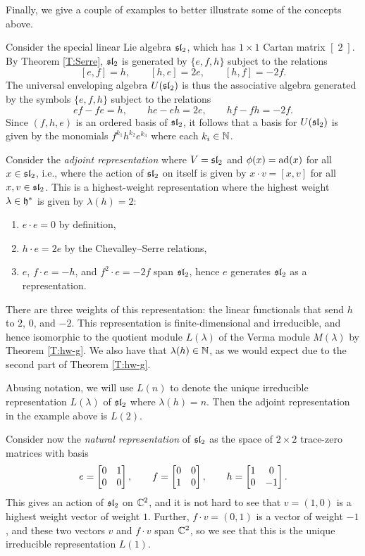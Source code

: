 Finally, we give a couple of examples to better illustrate some of the concepts above.

\begin{example}\label{E:sl2-ad}
    Consider the special linear Lie algebra $\mathfrak{sl}_2$, which has $1\times 1$ Cartan matrix $[\;2\;]$.
    By Theorem \ref{T:Serre}, $\mathfrak{sl}_2$ is generated by $\{e,f,h\}$ subject to the relations
    \[[e,f]=h, \qquad [h,e]=2e, \qquad [h,f]=-2f.\]
    The universal enveloping algebra $U(\mathfrak{sl}_2)$ is thus the associative algebra generated by the symbols $\{e,f,h\}$ subject to the relations
    \[ef-fe=h, \qquad he-eh=2e, \qquad hf-fh=-2f.\]
    Since $(f,h,e)$ is an ordered basis of $\mathfrak{sl}_2$, it follows that a basis for $U(\mathfrak{sl}_2)$ is given by the monomials $f^{k_1}h^{k_2}e^{k_3}$ where each $k_i\in\mathbb{N}$.

    Consider the \emph{adjoint representation} where $V=\mathfrak{sl}_2$ and $\phi(x)=\operatorname{ad}(x)$ for all $x\in\mathfrak{sl}_2$, i.e., where the action of $\mathfrak{sl}_2$ on itself is given by $x\cdot v=[x,v]$ for all $x,v\in\mathfrak{sl}_2$.
    This is a highest-weight representation where the highest weight $\lambda\in\mathfrak{h}^*$ is given by $\lambda(h)=2$:
    \begin{enumerate}
        \item $e\cdot e = 0$ by definition,
        \item $h\cdot e = 2e$ by the Chevalley--Serre relations,
        \item $e$, $f\cdot e = -h$, and $f^2\cdot e = -2f$ span $\mathfrak{sl}_2$, hence $e$ generates $\mathfrak{sl}_2$ as a representation.
    \end{enumerate}
    There are three weights of this representation: the linear functionals that send $h$ to $2$, $0$, and $-2$.
    This representation is finite-dimensional and irreducible, and hence isomorphic to the quotient module $L(\lambda)$ of the Verma module $M(\lambda)$ by Theorem \ref{T:hw-g}.
    We also have that $\lambda(h)\in\mathbb{N}$, as we would expect due to the second part of Theorem \ref{T:hw-g}.
\end{example}

Abusing notation, we will use $L(n)$ to denote the unique irreducible representation $L(\lambda)$ of $\mathfrak{sl}_2$ where $\lambda(h)=n$.
Then the adjoint representation in the example above is $L(2)$.

\begin{example}\label{E:sl2-C2}
    Consider now the \emph{natural representation} of $\mathfrak{sl}_2$ as the space of $2\times 2$ trace-zero matrices with basis
    \[e = \bmat{0 & 1 \\ 0 & 0}, \qquad f=\bmat{0 & 0 \\ 1 & 0}, \qquad h=\bmat{1 & 0 \\ 0 & -1}.\]
    This gives an action of $\mathfrak{sl}_2$ on $\mathbb{C}^2$, and it is not hard to see that $v=(1,0)$ is a highest weight vector of weight $1$.
    Further, $f\cdot v = (0,1)$ is a vector of weight $-1$, and these two vectors $v$ and $f\cdot v$ span $\mathbb{C}^2$, so we see that this is the unique irreducible representation $L(1)$.
\end{example}


